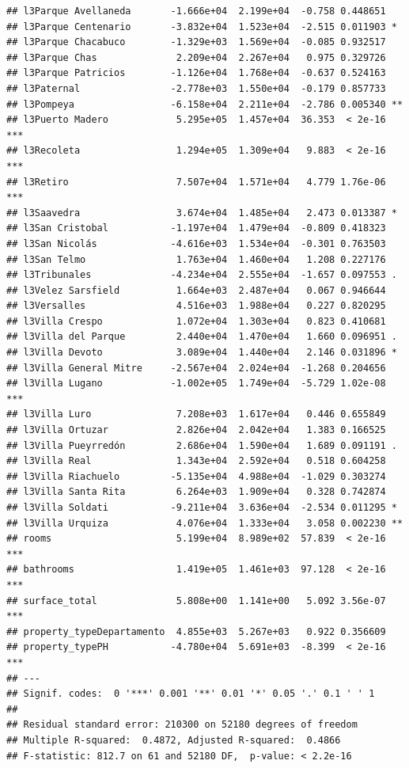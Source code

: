 \documentclass[]{book}
\begin{document}
\begin{verbatim}
## l3Parque Avellaneda       -1.666e+04  2.199e+04  -0.758 0.448651    
## l3Parque Centenario       -3.832e+04  1.523e+04  -2.515 0.011903 *  
## l3Parque Chacabuco        -1.329e+03  1.569e+04  -0.085 0.932517    
## l3Parque Chas              2.209e+04  2.267e+04   0.975 0.329726    
## l3Parque Patricios        -1.126e+04  1.768e+04  -0.637 0.524163    
## l3Paternal                -2.778e+03  1.550e+04  -0.179 0.857733    
## l3Pompeya                 -6.158e+04  2.211e+04  -2.786 0.005340 ** 
## l3Puerto Madero            5.295e+05  1.457e+04  36.353  < 2e-16 ***
## l3Recoleta                 1.294e+05  1.309e+04   9.883  < 2e-16 ***
## l3Retiro                   7.507e+04  1.571e+04   4.779 1.76e-06 ***
## l3Saavedra                 3.674e+04  1.485e+04   2.473 0.013387 *  
## l3San Cristobal           -1.197e+04  1.479e+04  -0.809 0.418323    
## l3San Nicolás             -4.616e+03  1.534e+04  -0.301 0.763503    
## l3San Telmo                1.763e+04  1.460e+04   1.208 0.227176    
## l3Tribunales              -4.234e+04  2.555e+04  -1.657 0.097553 .  
## l3Velez Sarsfield          1.664e+03  2.487e+04   0.067 0.946644    
## l3Versalles                4.516e+03  1.988e+04   0.227 0.820295    
## l3Villa Crespo             1.072e+04  1.303e+04   0.823 0.410681    
## l3Villa del Parque         2.440e+04  1.470e+04   1.660 0.096951 .  
## l3Villa Devoto             3.089e+04  1.440e+04   2.146 0.031896 *  
## l3Villa General Mitre     -2.567e+04  2.024e+04  -1.268 0.204656    
## l3Villa Lugano            -1.002e+05  1.749e+04  -5.729 1.02e-08 ***
## l3Villa Luro               7.208e+03  1.617e+04   0.446 0.655849    
## l3Villa Ortuzar            2.826e+04  2.042e+04   1.383 0.166525    
## l3Villa Pueyrredón         2.686e+04  1.590e+04   1.689 0.091191 .  
## l3Villa Real               1.343e+04  2.592e+04   0.518 0.604258    
## l3Villa Riachuelo         -5.135e+04  4.988e+04  -1.029 0.303274    
## l3Villa Santa Rita         6.264e+03  1.909e+04   0.328 0.742874    
## l3Villa Soldati           -9.211e+04  3.636e+04  -2.534 0.011295 *  
## l3Villa Urquiza            4.076e+04  1.333e+04   3.058 0.002230 ** 
## rooms                      5.199e+04  8.989e+02  57.839  < 2e-16 ***
## bathrooms                  1.419e+05  1.461e+03  97.128  < 2e-16 ***
## surface_total              5.808e+00  1.141e+00   5.092 3.56e-07 ***
## property_typeDepartamento  4.855e+03  5.267e+03   0.922 0.356609    
## property_typePH           -4.780e+04  5.691e+03  -8.399  < 2e-16 ***
## ---
## Signif. codes:  0 '***' 0.001 '**' 0.01 '*' 0.05 '.' 0.1 ' ' 1
## 
## Residual standard error: 210300 on 52180 degrees of freedom
## Multiple R-squared:  0.4872, Adjusted R-squared:  0.4866 
## F-statistic: 812.7 on 61 and 52180 DF,  p-value: < 2.2e-16
\end{verbatim}
\end{document}
